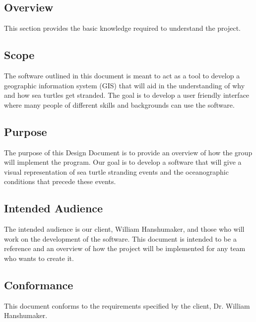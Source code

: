 \documentclass[onecolumn, draftclsnofoot,10pt, compsoc]{IEEEtran}
\begin{document}
\begin{singlespace}
\section{Overview}
    This section provides the basic knowledge required to understand the project.
        
    \subsection{Scope}
    The software outlined in this document is meant to act as a tool to develop a geographic information system (GIS) that will aid in the understanding of why and how sea turtles get stranded. The goal is to develop a user friendly interface where many people of different skills and backgrounds can use the software.
    
    \subsection{Purpose}
    The purpose of this Design Document is to provide an overview of how the group will implement the program. Our goal is to develop a software that will give a visual representation of sea turtle stranding events and the oceanographic conditions that precede these events.
    
    \subsection{Intended Audience}
    The intended audience is our client, William Hanshumaker, and those who will work on the development of the software. This document is intended to be a reference and an overview of how the project will be implemented for any team who wants to create it.
    
    \subsection{Conformance}
    This document conforms to the requirements specified by the client, Dr. William Hanshumaker.
\pagebreak

\end{singlespace}
\end{document}
